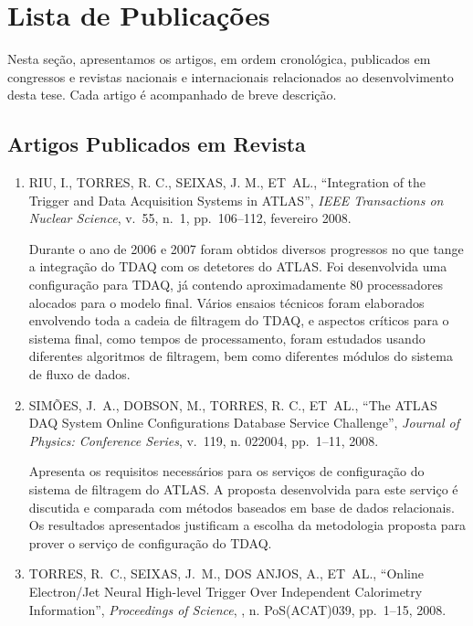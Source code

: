 \chapter{Lista de Publicações}
\label{chap:publicacoes}

\newcommand{\enquote}[1]{``#1''}

Nesta seção, apresentamos os artigos, em ordem cronológica, publicados em congressos e revistas nacionais e internacionais relacionados ao desenvolvimento desta tese. Cada artigo é acompanhado de breve descrição.

\section{Artigos Publicados em Revista}

\begin{enumerate}

\item \MakeUppercase{ Riu, I., Torres, R. C., Seixas, J. M., \MakeLowercase{et~al.}},
  \enquote{Integration of the Trigger and Data Acquisition Systems in {ATLAS}},
  {\em IEEE Transactions on Nuclear Science\/}, v.~55, n.~1, pp.~106--112,
  fevereiro 2008.

Durante o ano de 2006 e 2007 foram obtidos diversos progressos no que tange a integração do TDAQ com os detetores do ATLAS. Foi desenvolvida uma configuração para  TDAQ, já contendo aproximadamente 80 processadores alocados para o modelo final. Vários ensaios técnicos foram elaborados envolvendo toda a cadeia de filtragem do TDAQ, e aspectos críticos para o sistema final, como tempos de processamento, foram estudados usando diferentes algoritmos de filtragem, bem como diferentes módulos do sistema de fluxo de dados.

\item \MakeUppercase{ Sim{\~o}es, J.~A., Dobson, M., Torres, R. C.,
  \MakeLowercase{et~al.}}, \enquote{The {ATLAS} {DAQ} System Online
  Configurations Database Service Challenge}, {\em Journal of Physics:
  Conference Series\/}, v.~119, n. 022004, pp.~1--11, 2008.

Apresenta os requisitos necessários para os serviços de configuração do sistema de filtragem do ATLAS. A proposta desenvolvida para este serviço é discutida e comparada com métodos baseados em base de dados relacionais. Os resultados apresentados justificam a escolha da metodologia proposta para prover o serviço de configuração do TDAQ.

\item \MakeUppercase{ Torres, R.~C., Seixas, J.~M., {dos Anjos}, A.,
  \MakeLowercase{et~al.}}, \enquote{Online Electron/Jet Neural High-level
  Trigger Over Independent Calorimetry Information}, {\em Proceedings of
  Science\/}, , n. PoS(ACAT)039, pp.~1--15, 2008.


\end{enumerate}
